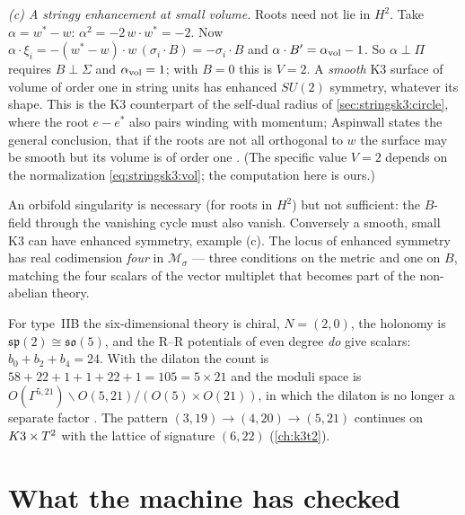 \emph{(c) A stringy enhancement at small volume.} Roots need not lie in $H^2$. Take
$\alpha=w^*-w$: $\alpha^2=-2\,w\cdot w^*=-2$. Now $\alpha\cdot\xi_i=-(w^*-w)\cdot w\,
(\sigma_i\cdot B)=-\sigma_i\cdot B$ and $\alpha\cdot B'=\alpha_{\rm vol}-1$. So $\alpha\perp\Pi$
requires $B\perp\Sigma$ and $\alpha_{\rm vol}=1$; with $B=0$ this is $V=2$. A \emph{smooth} K3
surface of volume of order one in string units has enhanced $SU(2)$ symmetry, whatever its
shape. This is the K3 counterpart of the self-dual radius of \cref{sec:stringsk3:circle}, where
the root $e-e^*$ also pairs winding with momentum; Aspinwall states the general conclusion,
that if the roots are not all orthogonal to $w$ the surface may be smooth but its volume is
of order one . (The specific value $V=2$ depends on the
normalization \eqref{eq:stringsk3:vol}; the computation here is ours.)

\begin{pitfallbox}
An orbifold singularity is necessary (for roots in $H^2$) but not sufficient: the $B$-field
through the vanishing cycle must also vanish. Conversely a smooth, small K3 can have enhanced
symmetry, example (c). The locus of enhanced symmetry has real codimension \emph{four} in
$\mathcal M_\sigma$ --- three conditions on the metric and one on $B$, matching the four scalars
of the vector multiplet that becomes part of the non-abelian theory.
\end{pitfallbox}

\begin{remark}\label{rem:stringsk3:IIB}
For type~IIB the six-dimensional theory is chiral, $N=(2,0)$, the holonomy is
$\mathfrak{sp}(2)\cong\mathfrak{so}(5)$, and the R--R potentials of even degree \emph{do}
give scalars: $b_0+b_2+b_4=24$. With the dilaton the count is $58+22+1+1+22+1=105=5\times21$
and the moduli space is $O(\Gamma^{5,21})\backslash O(5,21)/(O(5)\times O(21))$, in which the
dilaton is no longer a separate factor .
The pattern $(3,19)\to(4,20)\to(5,21)$ continues on $K3\times T^2$ with the lattice of signature
$(6,22)$ (\cref{ch:k3t2}).
\end{remark}

\section{What the machine has checked}\label{sec:stringsk3:lean}

